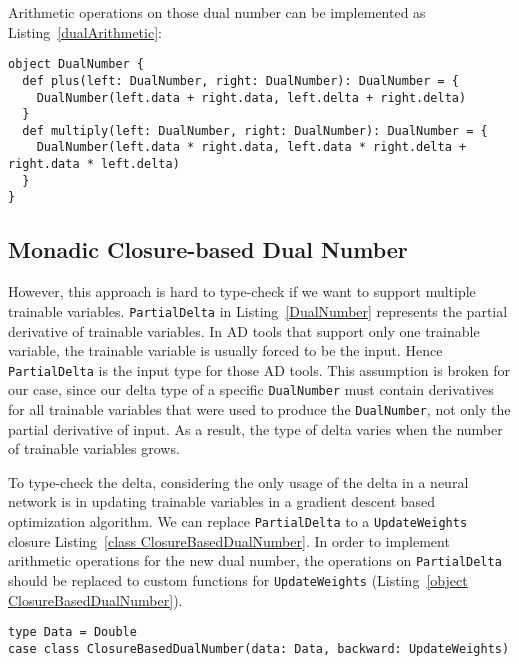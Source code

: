 Arithmetic operations on those dual number can be implemented as Listing~\ref{dualArithmetic}:

\begin{lstlisting}[float={h t b p},caption={Arithmetic operations on dual number}, label={dualArithmetic}]
object DualNumber {
  def plus(left: DualNumber, right: DualNumber): DualNumber = {
    DualNumber(left.data + right.data, left.delta + right.delta)
  }
  def multiply(left: DualNumber, right: DualNumber): DualNumber = {
    DualNumber(left.data * right.data, left.data * right.delta + right.data * left.delta)
  }
}
\end{lstlisting}

\subsection{Monadic Closure-based Dual Number}
\label{monadic dual number}

However, this approach is hard to type-check if we want to support multiple  \glspl{trainable variable}. \lstinline{PartialDelta} in Listing~\ref{DualNumber} represents the partial derivative of \glspl{trainable variable}. In AD tools that support only one \gls{trainable variable}, the \gls{trainable variable} is usually forced to be the input. Hence \lstinline{PartialDelta} is the input type for those AD tools. This assumption is broken for our case, since our delta type of a specific \lstinline{DualNumber} must contain derivatives for all \glspl{trainable variable} that were used to produce the \lstinline{DualNumber}, not only the partial derivative of input. As a result, the type of delta varies when the number of \glspl{trainable variable} grows.

To type-check the delta, considering the only usage of the delta in a neural network is in updating \glspl{trainable variable} in a gradient descent based optimization algorithm. We can replace \lstinline{PartialDelta} to a \lstinline{UpdateWeights} closure Listing~\ref{class ClosureBasedDualNumber}. In order to implement arithmetic operations for the new dual number, the operations on \lstinline{PartialDelta} should be replaced to custom functions for \lstinline{UpdateWeights} (Listing~\ref{object ClosureBasedDualNumber}).

\begin{lstlisting}[float={h t b p},caption={Replacing \lstinline{PartialDelta} to a closure}, label={class ClosureBasedDualNumber}]
type Data = Double  
case class ClosureBasedDualNumber(data: Data, backward: UpdateWeights)
\end{lstlisting}

